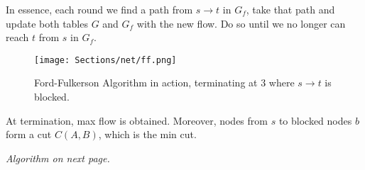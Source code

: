 \noindent
In essence, each round we find a path from $s\to t$ in $G_f$, take that path and update both tables $G$ and $G_f$ with the new flow. Do 
so until we no longer can reach $t$ from $s$ in $G_f$.

\begin{figure}[h]
    \centering
    \texttt{[image: Sections/net/ff.png]}
    \caption{Ford-Fulkerson Algorithm in action, terminating at 3 where $s\to t$ is blocked.}
\end{figure}

\begin{theo}

    At termination, max flow is obtained. Moreover, nodes from $s$ to blocked nodes $b$ form a cut $C(A,B)$, which is the min cut.
\end{theo}

\vfill

\begin{center}
    \textit{Algorithm on next page.}
\end{center}

\vfill

\newpage

